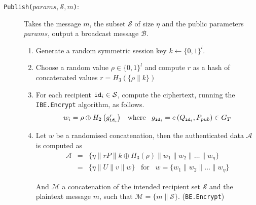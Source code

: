 \newpage
\thispagestyle{empty}
\begin{algorithm}[H]
\begin{description}
    \item[\texttt{Publish($params, \mathcal{S}, m$)}:] Takes the message $m$, the subset $\mathcal{S}$ of size $\eta$ and the public parameters $params$, output a broadcast message $\mathcal{B}$.

    \begin{enumerate}
        \item Generate a random symmetric session key $k \leftarrow \{ 0,1 \}^{l}$.
        \item Choose a random value $\rho \in \{ 0,1 \}^{l}$ and compute $r$ as a hash of concatenated values $r = H_3 \left( \{ \rho \parallel k \} \right)$
        \item For each recipient $\mathtt{id}_{i} \in \mathcal{S}$, compute the ciphertext, running the \texttt{IBE.Encrypt} algorithm, as follows.
            \begin{equation*}
                w_i = \rho \oplus H_2 \left( g_{\mathtt{id}_{i}}^r \right) \; \; \; \textrm{where} \; \; \; g_{\mathtt{id}_{i}} = e \left( Q_{\mathtt{id}_{i}}, P_{pub} \right) \in G_T
            \end{equation*}
        \item Let $w$ be a randomised concatenation, then the authenticated data $\mathcal{A}$ is computed as                                  
        \begin{equation*}
                \begin{array}{lcl}
                    \mathcal{A} & = & \{ \eta \parallel rP \parallel k \oplus H_3 \left( \rho \right) \parallel w_1 \parallel w_2 \parallel \ldots \parallel w_\eta \} \\
                    & = & \{ \eta \parallel U \parallel v \parallel w \} \; \; \; \textrm{for} \; \; \; w = \{ w_1 \parallel w_2 \parallel \ldots \parallel w_\eta \}
                \end{array} 
            \end{equation*}
            
        And $\mathcal{M}$ a concatenation of the intended recipient set $\mathcal{S}$ and the plaintext message $m$, such that $\mathcal{M} = \{ m \parallel \mathcal{S} \}$. (\texttt{BE.Encrypt})
    

\end{enumerate}
\end{description}
\end{algorithm}
